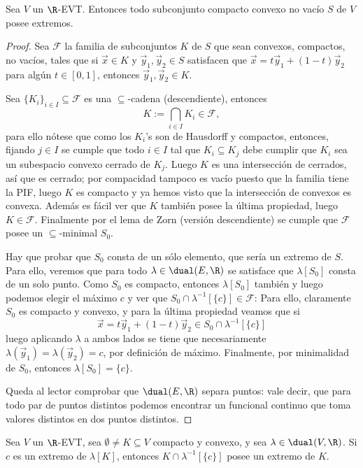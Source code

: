 \documentclass[topologia-analisis.tex]{subfiles}
\begin{document}
\begin{thm}
	Sea $V$ un $\R$-EVT.
	Entonces todo subconjunto compacto convexo no vacío $S$ de $V$ posee extremos.
\end{thm}
\begin{proof}
	Sea $ \mathcal{F} $ la familia de subconjuntos $K$ de $S$ que sean convexos, compactos, no vacíos,
	tales que si $\vec x \in K$ y $\vec y_1,\vec y_2 \in S$ satisfacen que $\vec x = t\vec y_1 + (1 - t)\vec y_2$
	para algún $t \in [0, 1]$, entonces $\vec y_1, \vec y_2 \in K$.

	Sea $\{ K_i \}_{i\in I} \subseteq \mathcal{F}$ es una $\subseteq$-cadena (descendiente), entonces
	$$ K := \bigcap_{i\in I} K_i \in \mathcal{F}, $$
	para ello nótese que como los $K_i$'s son de Hausdorff y compactos, entonces, fijando $j \in I$
	se cumple que todo $i\in I$ tal que $K_i \subseteq K_j$ debe cumplir que $K_i$ sea un subespacio convexo cerrado de $K_j$.
	Luego $K$ es una intersección de cerrados, así que es cerrado; por compacidad tampoco es vacío puesto que la familia tiene la PIF,
	luego $K$ es compacto y ya hemos visto que la intersección de convexos es convexa.
	Además es fácil ver que $K$ también posee la última propiedad, luego $K \in \mathcal{F}$.
	Finalmente por el lema de Zorn (versión descendiente) se cumple que $\mathcal{F}$ posee un $\subseteq$-minimal $S_0$.

	Hay que probar que $S_0$ consta de un sólo elemento, que sería un extremo de $S$.
	Para ello, veremos que para todo $\lambda \in \dual(E, \R)$ se satisface que $\lambda[S_0]$ consta de un solo punto.
	Como $S_0$ es compacto, entonces $\lambda[S_0]$ también y luego podemos elegir el máximo $c$ y ver que $S_0 \cap \lambda^{-1}[ \{c\} ] \in \mathcal{F}$:
	Para ello, claramente $S_0$ es compacto y convexo, y para la última propiedad veamos que si
	$$ \vec x = t\vec y_1 + (1 - t)\vec y_2 \in S_0 \cap \lambda^{-1}[ \{c\} ] $$
	luego aplicando $\lambda$ a ambos lados se tiene que necesariamente $\lambda(\vec y_1) = \lambda(\vec y_2) = c$, por definición de máximo.
	Finalmente, por minimalidad de $S_0$, entonces $\lambda[S_0] = \{c\}$.
	\par
	Queda al lector comprobar que $\dual(E, \R)$ separa puntos: vale decir, que para todo par de puntos distintos podemos encontrar un funcional
	continuo que toma valores distintos en dos puntos distintos.
\end{proof}

\begin{cor}
	Sea $V$ un $\R$-EVT, sea $\emptyset \ne K \subseteq V$ compacto y convexo, y sea $\lambda \in \dual(V, \R)$.
	Si $c$ es un extremo de $\lambda[K]$, entonces $K \cap \lambda^{-1}[ \{c\} ]$ posee un extremo de $K$.
\end{cor}
\end{document}
